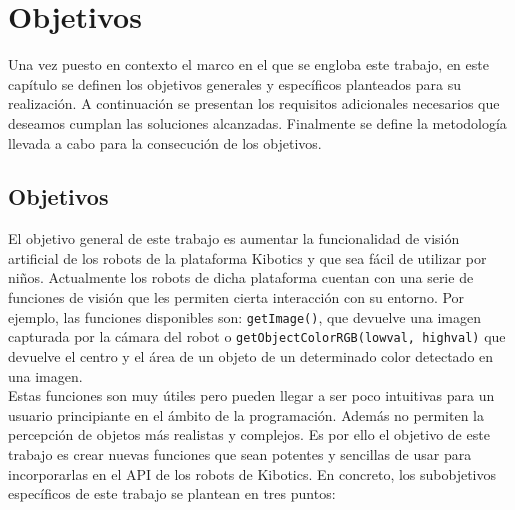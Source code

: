 \documentclass{report}
\begin{document}
\chapter{Objetivos}
Una vez puesto en contexto el marco en el que se engloba este trabajo, en este capítulo se definen los objetivos generales y específicos planteados para su realización. A continuación se presentan los requisitos adicionales necesarios que deseamos cumplan las soluciones alcanzadas. Finalmente se define la metodología llevada a cabo para la consecución de los objetivos.

\section{Objetivos}
El objetivo general de este trabajo es aumentar la funcionalidad de visión artificial de los robots de la plataforma Kibotics y que sea fácil de utilizar por niños. Actualmente los robots de dicha plataforma cuentan con una serie de funciones de visión que les permiten cierta interacción con su entorno. Por ejemplo, las funciones disponibles son: \texttt{getImage()}, que devuelve una imagen capturada por la cámara del robot o \texttt{getObjectColorRGB(lowval, highval)} que devuelve el centro y el área de un objeto de un determinado color detectado en una imagen. 
\\

Estas funciones son muy útiles pero pueden llegar a ser poco intuitivas para un usuario principiante en el ámbito de la programación. Además no permiten la percepción de objetos más realistas y complejos. Es por ello el objetivo de este trabajo es crear nuevas funciones que sean potentes y sencillas de usar para incorporarlas en el API de los robots de Kibotics. En concreto, los subobjetivos específicos de este trabajo se plantean en tres puntos:
\end{document}
